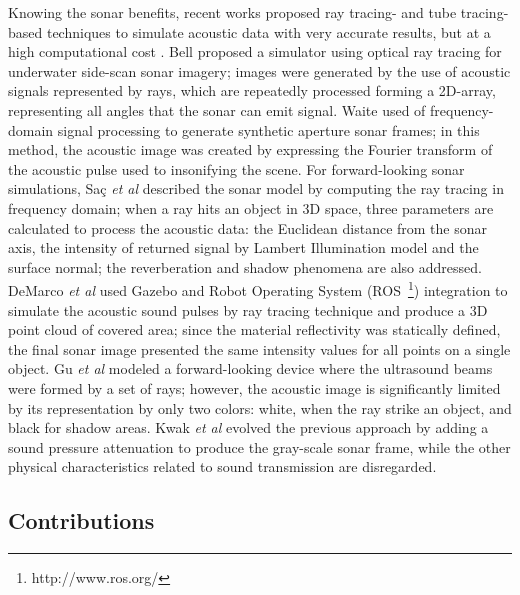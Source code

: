 \documentclass[final,5p,times]{elsarticle}
\begin{document}
Knowing the sonar benefits, recent works proposed ray tracing- and tube tracing-based techniques to simulate acoustic data with very accurate results, but at a high computational cost \cite{bell1997,waite2002,sac2015,demarco2015,gu2013,kwak2015}. Bell \cite{bell1997} proposed a simulator using optical ray tracing for underwater side-scan sonar imagery; images were generated by the use of acoustic signals represented by rays, which are repeatedly processed forming a 2D-array, representing all angles that the sonar can emit signal. Waite \cite{waite2002} used of frequency-domain signal processing to generate synthetic aperture sonar frames; in this method, the acoustic image was created by expressing the Fourier transform of the acoustic pulse used to insonifying the scene. For forward-looking sonar simulations, Saç \textit{et al} \cite{sac2015} described the sonar model by computing the ray tracing in frequency domain; when a ray hits an object in 3D space, three parameters are calculated to process the acoustic data: the Euclidean distance from the sonar axis, the intensity of returned signal by Lambert Illumination model and the surface normal; the reverberation and shadow phenomena are also addressed. DeMarco \textit{et al} \cite{demarco2015} used Gazebo and Robot Operating System (ROS~\footnote{http://www.ros.org/}) integration to simulate the acoustic sound pulses by ray tracing technique and produce a 3D point cloud of covered area; since the material reflectivity was statically defined, the final sonar image presented the same intensity values for all points on a single object. Gu \textit{et al} \cite{gu2013} modeled a forward-looking device where the ultrasound beams were formed by a set of rays; however, the acoustic image is significantly limited by its representation by only two colors: white, when the ray strike an object, and black for shadow areas. Kwak \textit{et al} \cite{kwak2015} evolved the previous approach by adding a sound pressure attenuation to produce the gray-scale sonar frame, while the other physical characteristics related to sound transmission are disregarded.

\subsection{Contributions}

\end{document}
